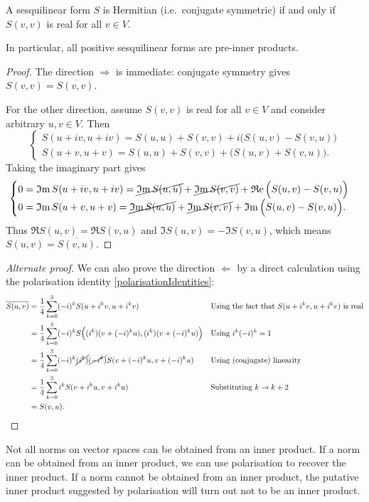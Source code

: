 \begin{proposition} \label{HermitianRealQuadratic}
A sesquilinear form $S$ is Hermitian (i.e.\ conjugate symmetric) \textup{if and only if} $S(v,v)$ is real for all $v\in V$.

In particular, all positive sesquilinear forms are pre-inner products.
\end{proposition}
\begin{proof}
The direction $\boxed{\Rightarrow}$ is immediate: conjugate symmetry gives $S(v,v) = \overline{S(v,v)}$.

For the other direction, assume $S(v,v)$ is real for all $v\in V$ and consider arbitrary $u,v\in V$. Then
\[ \begin{cases}
S(u+iv, u+iv) = S(u,u) + S(v,v) + i\Big(S(u,v) - S(v,u)\Big) \\
S(u+v, u+v) = S(u,u) + S(v,v) + \Big(S(u,v) + S(v,u)\Big).
\end{cases} \]
Taking the imaginary part gives
\[ \begin{cases}
0 = \Im S(u+iv, u+iv) = \cancel{\Im S(u,u)} + \cancel{\Im S(v,v)} + \Re\Big(S(u,v) - S(v,u)\Big) \\
0 = \Im S(u+v, u+v) = \cancel{\Im S(u,u)} + \cancel{\Im S(v,v)} + \Im\Big(S(u,v) - S(v,u)\Big).
\end{cases} \]
Thus $\Re S(u,v) = \Re S(v,u)$ and $\Im S(u,v) = - \Im S(v,u)$, which means $S(u, v) = \overline{S(v,u)}$.
\end{proof}
\begin{proof}[Alternate proof]
We can also prove the direction $\Leftarrow$ by a direct calculation using the polarisation identity \ref{polarisationIdentities}:
\begin{align*}
\overline{S(u,v)} &= \frac{1}{4}\sum^3_{k=0}(-i)^kS(u+i^kv,u+i^kv) & &\text{Using the fact that $S(u+i^kv,u+i^kv)$ is real} \\
&= \frac{1}{4}\sum^3_{k=0}(-i)^kS\Big((i^k)(v+(-i)^ku),(i^k)(v+(-i)^ku)\Big) & &\text{Using $i^k(-i)^k=1$}\\
&= \frac{1}{4}\sum^3_{k=0}(-i)^k\cancel{(i^k)}\cancel{(-i^k)}S(v+(-i)^ku,v+(-i)^ku) & &\text{Using (conjugate) linearity}\\
&= \frac{1}{4}\sum^3_{k=0}i^kS(v+i^ku,v+i^ku) & &\text{Substituting $k\to k+2$}\\
&= S(v,u).
\end{align*}
\end{proof}
Not all norms on vector spaces can be obtained from an inner product. If a norm can be obtained from an inner product, we can use polarisation to recover the inner product. If a norm cannot be obtained from an inner product, the putative inner product suggested by polarisation will turn out not to be an inner product.
